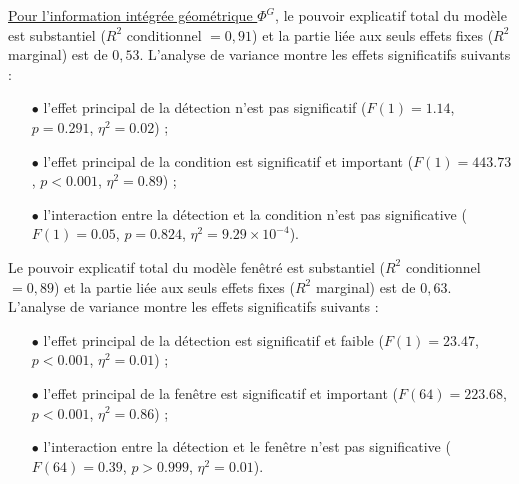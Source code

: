 \underline{Pour l'information intégrée géométrique $\Phi^{G}$}, le pouvoir explicatif total du modèle est substantiel ($R^2$ conditionnel $=0,91$) et la partie liée aux seuls effets fixes ($R^2$ marginal) est de $0,53$. 
L'analyse de variance montre les effets significatifs suivants : 
\begin{itemize}
\item[$\bullet$] l'effet principal de la détection n'est pas significatif ($F(1)=1.14$, $p=0.291$, $\eta^2=0.02$) ; 
\item[$\bullet$] l'effet principal de la condition est significatif et important ($F(1)=443.73$, $p<0.001$, $\eta^2=0.89$) ; 
\item[$\bullet$] l'interaction entre la détection et la condition n'est pas significative ($F(1)=0.05$, $p=0.824$, $\eta^2=9.29\times10^{-4}$).
\end{itemize}
Le pouvoir explicatif total du modèle fenêtré est substantiel ($R^2$ conditionnel $=0,89$) et la partie liée aux seuls effets fixes ($R^2$ marginal) est de $0,63$. 
L'analyse de variance montre les effets significatifs suivants : 
\begin{itemize}
\item[$\bullet$] l'effet principal de la détection est significatif et faible ($F(1)=23.47$, $p<0.001$, $\eta^2=0.01$) ; 
\item[$\bullet$] l'effet principal de la fenêtre est significatif et important ($F(64)=223.68$, $p<0.001$, $\eta^2=0.86$) ; 
\item[$\bullet$] l'interaction entre la détection et le fenêtre n'est pas significative ($F(64)=0.39$, $p>0.999$, $\eta^2=0.01$). \\
\end{itemize}

